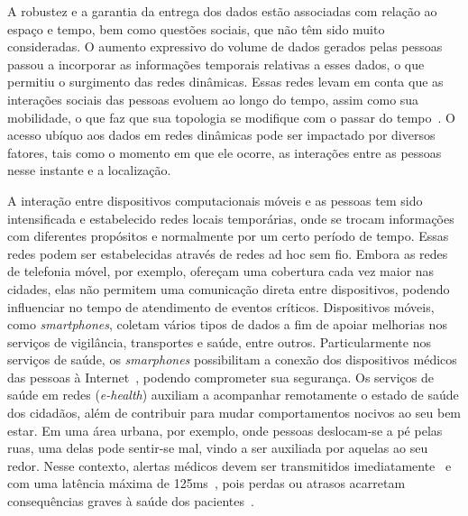 A robustez e a garantia da entrega dos dados estão associadas com relação ao espaço e tempo, bem como questões sociais, que não têm sido muito consideradas. O aumento expressivo do volume de dados gerados pelas pessoas passou a incorporar as informações temporais relativas a esses dados, o que permitiu o surgimento das redes dinâmicas. Essas redes levam em conta que as interações sociais das pessoas evoluem ao longo do tempo, assim como sua mobilidade, o que faz que sua topologia se modifique com o passar do tempo~\cite{rossetti2017community}. O acesso ubí\-quo aos dados em redes dinâmicas pode ser impactado por diversos fatores, tais como o momento em que ele ocorre, as interações entre as pessoas nesse instante e a localização.

A interação entre dispositivos computacionais móveis e as pessoas tem sido intensificada e estabelecido redes locais temporárias, onde se trocam informações com diferentes propósitos e normalmente por um certo período de tempo. Essas redes podem ser estabelecidas através de redes ad hoc sem fio. Embora as redes de telefonia móvel, por exemplo, ofereçam uma cobertura cada vez maior nas cidades, elas não permitem uma comunicação direta entre dispositivos, podendo influenciar no tempo de atendimento de eventos críticos. Dispositivos móveis, como \textit{smartphones}, coletam vários tipos de dados a fim de apoiar melhorias nos serviços de vigilância, transportes e saúde, entre outros. Particularmente nos serviços de saúde, os \textit{smarphones} possibilitam a conexão dos dispositivos médicos das pessoas à Internet~\cite{williams2016perfect}, podendo comprometer sua segurança. Os serviços de saúde em redes (\textit{e-health})  auxiliam  a acompanhar remotamente o estado de saúde dos cidadãos, além de contribuir para mudar comportamentos nocivos ao seu bem estar. Em uma área urbana, por exemplo, onde pessoas deslocam-se a pé pelas ruas, uma delas pode sentir-se mal, vindo a ser auxiliada por aquelas ao seu redor. Nesse contexto, alertas médicos devem ser transmitidos imediatamente~\cite{movassaghi2014wireless} e com uma latência máxima de 125ms~\cite{ieee2012}, pois perdas ou atrasos acarretam consequências graves à saúde dos pacientes~\cite{latre2011survey}.

